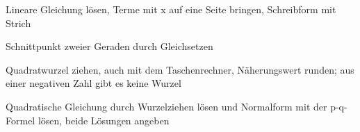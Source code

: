 \begin{aufgabe}{Lineare Gleichung lösen, Terme mit x auf eine Seite bringen, Schreibform mit Strich}
\end{aufgabe}

\begin{aufgabe}{Schnittpunkt zweier Geraden durch Gleichsetzen}
\end{aufgabe}

\begin{aufgabe}{Quadratwurzel ziehen, auch mit dem Taschenrechner, Näherungswert runden; aus einer negativen Zahl gibt es keine Wurzel}
\end{aufgabe}

\begin{aufgabe}{Quadratische Gleichung durch Wurzelziehen lösen und Normalform mit der p-q-Formel lösen, beide Lösungen angeben}
\end{aufgabe}

